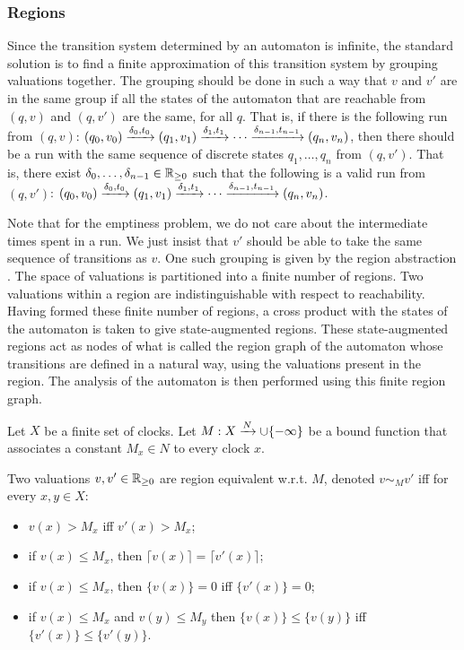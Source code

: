 \subsubsection{Regions}

Since the transition system determined by an automaton is infinite, the standard solution is to find a finite approximation of this transition system by grouping valuations together. The grouping should be done in such a way that $v$ and $v'$ are in the same group if all the states of the automaton that are reachable from $(q, v)$ and $(q, v')$ are the same, for all $q$. That is, if there is the following run from $(q, v)$: $(q_0, v_0) \xrightarrow{\delta_0, t_0} (q_1, v_1) \xrightarrow{\delta_1, t_1} \cdots \xrightarrow{\delta_{n-1}, t_{n-1}} (q_n, v_n)$, then there should be a run with the same sequence of discrete states $q_1, \dots ,q_n$ from $(q, v')$. That is, there exist $\delta_0, \dots, \delta_{n-1} \in \mathbb{R}_{\ge 0}$ such that the following is a valid run from $(q, v')$: $(q_0, v_0) \xrightarrow{\delta_0, t_0} (q_1, v_1) \xrightarrow{\delta_1, t_1} \cdots \xrightarrow{\delta_{n-1}, t_{n-1}} (q_n, v_n)$.

Note that for the emptiness problem, we do not care about the intermediate times spent in a run. We just insist that $v'$ should be able to take the same sequence of transitions as $v$. One such grouping is given by the region abstraction \cite{}. The space of valuations is partitioned into a finite number of regions. Two valuations within a region are indistinguishable with respect to reachability. Having formed these finite number of regions, a cross product with the states of the automaton is taken to give state-augmented regions. These state-augmented regions act as nodes of what is called the region graph of the automaton whose transitions are defined in a natural way, using the valuations present in the region. The analysis of the automaton is then performed using this finite region graph. 

Let $X$ be a finite set of clocks. Let $M : X \xrightarrow{N} \cup \{-\infty\}$ be a bound function that associates a constant $M_x \in N$ to every clock $x$.

\begin{definition}
Two valuations $v, v' \in \mathbb{R}_{\ge 0}$ are region equivalent w.r.t. $M$, denoted $v \sim_M v'$ iﬀ for every $x, y \in X$:
\begin{itemize}
	\item $v(x) > M_x$ iﬀ $v'(x) > M_x$;
	\item if $v(x) \leq M_x$, then $\lceil v(x) \rceil = \lceil v'(x) \rceil$;
	\item if $v(x) \leq M_x$, then $\{v(x)\} = 0$ iﬀ $\{v'(x)\} = 0$;
	\item if $v(x) \leq M_x$ and $v(y) \leq M_y$ then $\{v(x)\} \leq \{v(y)\}$ iﬀ $\{v'(x)\} \leq \{v'(y)\}$.
\end{itemize}
\end{definition}

